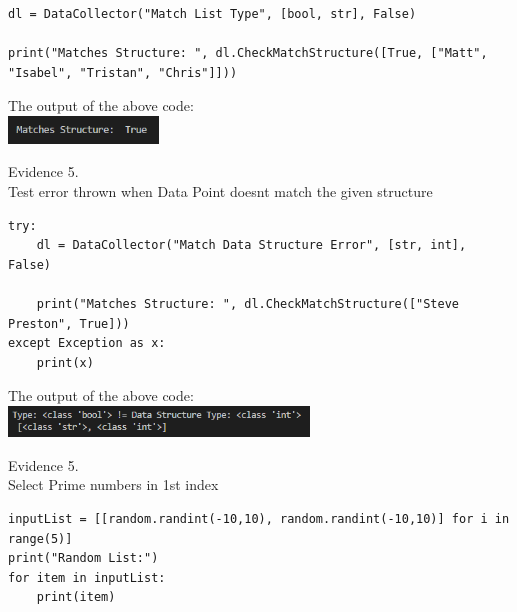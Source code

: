 \begin{flushleft}
\begin{center}
        \begin{verbatim}
dl = DataCollector("Match List Type", [bool, str], False)

print("Matches Structure: ", dl.CheckMatchStructure([True, ["Matt", "Isabel", "Tristan", "Chris"]]))
        \end{verbatim}
                        
        The output of the above code: \\
        \includegraphics[width=4cm]{Images/Testing/T4.5.1.PNG} \\
        \vspace{1cm}

        {\large Evidence 5.\rn } \\ 
        \vspace{0.3cm}
        Test error thrown when Data Point doesnt match the given structure \\

        \begin{verbatim}
try:
    dl = DataCollector("Match Data Structure Error", [str, int], False)

    print("Matches Structure: ", dl.CheckMatchStructure(["Steve Preston", True]))
except Exception as x:
    print(x)
        \end{verbatim}

        The output of the above code: \\
        \includegraphics[width=8cm]{Images/Testing/T4.6.1.PNG} \\
        \vspace{1cm}

        {\large Evidence 5.\rn } \\ 
        \vspace{0.3cm}
        Select Prime numbers in 1st index\\

        \begin{verbatim}
inputList = [[random.randint(-10,10), random.randint(-10,10)] for i in range(5)]
print("Random List:")
for item in inputList:
    print(item)


\end{verbatim}
\end{center}
\end{flushleft}
